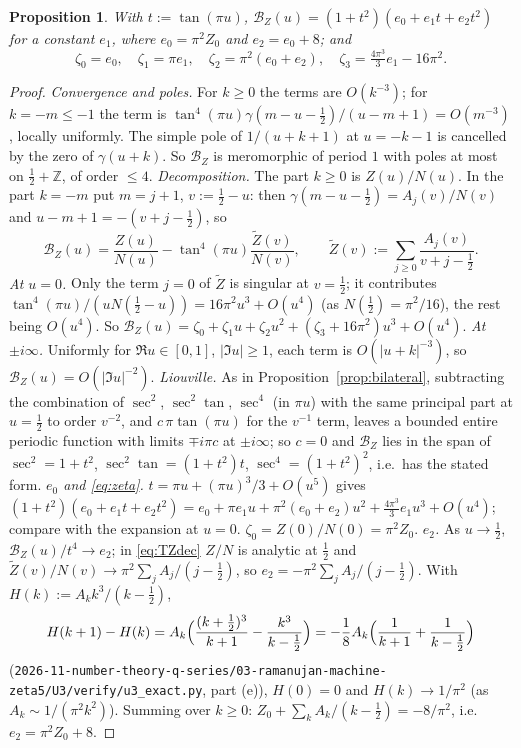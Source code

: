 \documentclass[11pt]{amsart}
\newtheorem{proposition}[theorem]{Proposition}
\theoremstyle{definition}
\theoremstyle{remark}
\numberwithin{equation}{section}
\newcommand{\Z}{\mathbb{Z}}
\newcommand{\file}[1]{\nolinkurl{2026-11-number-theory-q-series/03-ramanujan-machine-zeta5/#1}}
\begin{document}
\begin{proposition}\label{prop:TZ}
With $t:=\tan(\pi u)$, $\mathcal B_Z(u)=(1+t^2)(e_0+e_1t+e_2t^2)$ for a constant $e_1$, where $e_0=\pi^2Z_0$ and $e_2=e_0+8$; and
\begin{equation}\label{eq:zeta}
\zeta_0=e_0,\quad\zeta_1=\pi e_1,\quad\zeta_2=\pi^2(e_0+e_2),\quad\zeta_3=\tfrac{4\pi^3}3e_1-16\pi^2 .
\end{equation}
\end{proposition}
\begin{proof}
\emph{Convergence and poles.} For $k\ge0$ the terms are $O(k^{-3})$; for $k=-m\le-1$ the term is $\tan^4(\pi u)\gamma(m-u-\frac12)/(u-m+1)=O(m^{-3})$, locally uniformly. The simple pole of $1/(u+k+1)$ at $u=-k-1$ is cancelled by the zero of $\gamma(u+k)$. So $\mathcal B_Z$ is meromorphic of period $1$ with poles at most on $\frac12+\Z$, of order $\le4$.
\emph{Decomposition.} The part $k\ge0$ is $Z(u)/N(u)$. In the part $k=-m$ put $m=j+1$, $v:=\frac12-u$: then $\gamma(m-u-\frac12)=A_j(v)/N(v)$ and $u-m+1=-(v+j-\frac12)$, so
\begin{equation}\label{eq:TZdec}
\mathcal B_Z(u)=\frac{Z(u)}{N(u)}-\tan^4(\pi u)\frac{\tilde Z(v)}{N(v)},\qquad\tilde Z(v):=\sum_{j\ge0}\frac{A_j(v)}{v+j-\frac12}.
\end{equation}
\emph{At $u=0$.} Only the term $j=0$ of $\tilde Z$ is singular at $v=\frac12$; it contributes $\tan^4(\pi u)/(uN(\frac12-u))=16\pi^2u^3+O(u^4)$ (as $N(\frac12)=\pi^2/16$), the rest being $O(u^4)$. So $\mathcal B_Z(u)=\zeta_0+\zeta_1u+\zeta_2u^2+(\zeta_3+16\pi^2)u^3+O(u^4)$.
\emph{At $\pm i\infty$.} Uniformly for $\Re u\in[0,1]$, $|\Im u|\ge1$, each term is $O(|u+k|^{-3})$, so $\mathcal B_Z(u)=O(|\Im u|^{-2})$.
\emph{Liouville.} As in Proposition~\ref{prop:bilateral}, subtracting the combination of $\sec^2$, $\sec^2\tan$, $\sec^4$ (in $\pi u$) with the same principal part at $u=\frac12$ to order $v^{-2}$, and $c\,\pi\tan(\pi u)$ for the $v^{-1}$ term, leaves a bounded entire periodic function with limits $\mp i\pi c$ at $\pm i\infty$; so $c=0$ and $\mathcal B_Z$ lies in the span of $\sec^2=1+t^2$, $\sec^2\tan=(1+t^2)t$, $\sec^4=(1+t^2)^2$, i.e.\ has the stated form.
\emph{$e_0$ and \eqref{eq:zeta}.} $t=\pi u+(\pi u)^3/3+O(u^5)$ gives $(1+t^2)(e_0+e_1t+e_2t^2)=e_0+\pi e_1u+\pi^2(e_0+e_2)u^2+\frac{4\pi^3}3e_1u^3+O(u^4)$; compare with the expansion at $u=0$. $\zeta_0=Z(0)/N(0)=\pi^2Z_0$.
\emph{$e_2$.} As $u\to\frac12$, $\mathcal B_Z(u)/t^4\to e_2$; in \eqref{eq:TZdec} $Z/N$ is analytic at $\frac12$ and $\tilde Z(v)/N(v)\to\pi^2\sum_jA_j/(j-\frac12)$, so $e_2=-\pi^2\sum_jA_j/(j-\frac12)$. With $H(k):=A_kk^3/(k-\frac12)$,
\[
H(k+1)-H(k)=A_k\Bigl(\frac{(k+\frac12)^3}{k+1}-\frac{k^3}{k-\frac12}\Bigr)=-\frac18A_k\Bigl(\frac1{k+1}+\frac1{k-\frac12}\Bigr)
\]
(\file{U3/verify/u3_exact.py}, part (e)), $H(0)=0$ and $H(k)\to1/\pi^2$ (as $A_k\sim1/(\pi^2k^2)$). Summing over $k\ge0$: $Z_0+\sum_kA_k/(k-\frac12)=-8/\pi^2$, i.e.\ $e_2=\pi^2Z_0+8$.
\end{proof}
\end{document}
